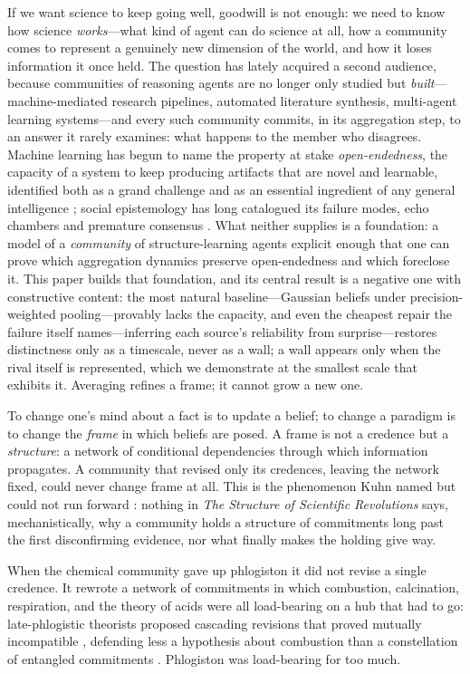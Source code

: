 \documentclass[runningheads]{llncs}
\begin{document}
If we want science to keep going well, goodwill is not enough: we need to know how science
\emph{works}---what kind of agent can do science at all, how a community comes to represent a
genuinely new dimension of the world, and how it loses information it once held. The question has
lately acquired a second audience, because communities of reasoning agents are no longer only
studied but \emph{built}---machine-mediated research pipelines, automated literature synthesis,
multi-agent learning systems---and every such community commits, in its aggregation step, to an
answer it rarely examines: what happens to the member who disagrees. Machine learning has begun
to name the property at stake \emph{open-endedness}, the capacity of a system to keep producing
artifacts that are novel and learnable, identified both as a grand challenge
\citep{stanley2017oe} and as an essential ingredient of any general intelligence
\citep{hughes2024}; social epistemology has long catalogued its failure modes, echo chambers
\citep{nguyen2018} and premature consensus \citep{zollman2010}. What neither supplies is a
foundation: a model of a \emph{community} of structure-learning agents explicit enough that one
can prove which aggregation dynamics preserve open-endedness and which foreclose it. This paper
builds that foundation, and its central result is a negative one with constructive content: the
most natural baseline---Gaussian beliefs under precision-weighted pooling---provably lacks the
capacity, and even the cheapest repair the failure itself names---inferring each source's
reliability from surprise---restores distinctness only as a timescale, never as a wall; a wall
appears only when the rival itself is represented, which we demonstrate at the smallest scale
that exhibits it. Averaging refines a frame; it cannot grow a new one.

To change one's mind about a fact is to update a belief; to change a paradigm is to change the
\emph{frame} in which beliefs are posed. A frame is not a credence but a \emph{structure}: a
network of conditional dependencies through which information propagates. A community that revised
only its credences, leaving the network fixed, could never change frame at all. This is the
phenomenon Kuhn named but could not run forward \citep{kuhn1962}: nothing in \emph{The Structure of
Scientific Revolutions} says, mechanistically, why a community holds a structure of commitments
long past the first disconfirming evidence, nor what finally makes the holding give way.

When the chemical community gave up phlogiston it did not revise a single credence. It rewrote a
network of commitments in which combustion, calcination, respiration, and the theory of acids were
all load-bearing on a hub that had to go: late-phlogistic theorists proposed cascading revisions that
proved mutually incompatible \citep{blumenthal2017,holmes2000}, defending less a hypothesis about
combustion than a constellation of entangled commitments \citep{boantza2011}. Phlogiston was
load-bearing for too much.
\end{document}
